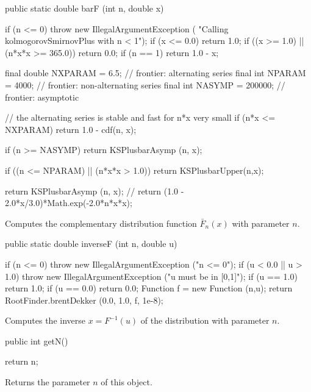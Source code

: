 \begin{code}
   public static double barF (int n, double x)\begin{hide} {
      if (n <= 0)
        throw new IllegalArgumentException (
                             "Calling kolmogorovSmirnovPlus with n < 1");
      if (x <= 0.0)
         return 1.0;
      if ((x >= 1.0) || (n*x*x >= 365.0))
         return 0.0;
      if (n == 1)
         return 1.0 - x;

      final double NXPARAM = 6.5;    // frontier: alternating series
      final int NPARAM = 4000;       // frontier: non-alternating series
      final int NASYMP = 200000;     // frontier: asymptotic

      // the alternating series is stable and fast for n*x very small
      if (n*x <= NXPARAM)
         return 1.0 - cdf(n, x);

      if (n >= NASYMP)
         return KSPlusbarAsymp (n, x);

      if ((n <= NPARAM) || (n*x*x > 1.0))
         return KSPlusbarUpper(n,x);

      return KSPlusbarAsymp (n, x);
      // return (1.0 - 2.0*x/3.0)*Math.exp(-2.0*n*x*x);
   }\end{hide}
\end{code}
\begin{tabb}
  Computes the complementary  distribution function  $\bar F_n(x)$
  with parameter $n$.
\end{tabb}
\begin{code}

   public static double inverseF (int n, double u)\begin{hide} {
      if (n <= 0)
         throw new IllegalArgumentException ("n <= 0");
      if (u < 0.0 || u > 1.0)
         throw new IllegalArgumentException ("u must be in [0,1]");
      if (u == 1.0)
         return 1.0;
      if (u == 0.0)
         return 0.0;
      Function f = new Function (n,u);
      return RootFinder.brentDekker (0.0, 1.0, f, 1e-8);
   }\end{hide}
\end{code}
\begin{tabb}
  Computes the inverse $x = F^{-1}(u)$ of the distribution with parameter $n$.
\end{tabb}
\begin{code}

   public int getN()\begin{hide} {
      return n;
   }\end{hide}
\end{code}
 \begin{tabb} Returns the parameter $n$ of this object.
 \end{tabb}
